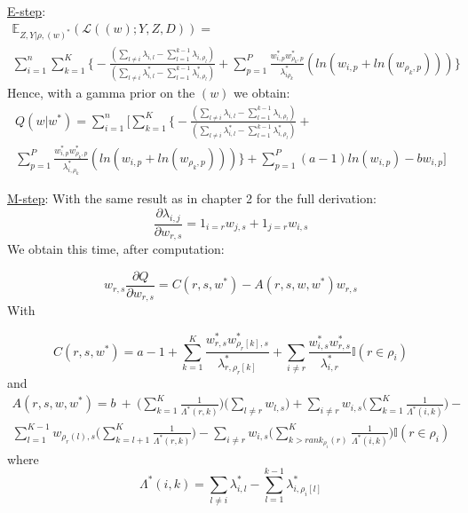 \documentclass[12pt]{ociamthesis}  %
\begin{document}
	\underline{E-step}:
	\begin{multline}
	\mathbb{E}_{Z,Y | \rho, (w)^{*}}(\mathcal{L}((w);Y,Z,D)) = \\ \sum_{i = 1}^{n} \sum_{k = 1}^{K} \bigg\{ -\frac{(\sum_{l \neq i} \lambda_{i,l} - \sum_{l = 1}^{k - 1} \lambda_{i,\rho_{l}})}{(\sum_{l \neq i} \lambda^{*}_{i,l} - \sum_{l = 1}^{k - 1} \lambda^{*}_{i,\rho_{l}})} + \sum_{p = 1}^{P} \frac{w^{*}_{i,p}w^{*}_{\rho_{k},p}}{\lambda^{*}_{i\rho_{k}}} (ln(w_{i,p} + ln(w_{\rho_{k},p}))) \bigg\}
	\end{multline} Hence, with a gamma prior on the $(w)$ we obtain:
	\begin{multline}
	Q(w|w^{*}) = \sum_{i = 1}^{n} \Bigg[ \sum_{k = 1}^{K} \bigg\{ -\frac{(\sum_{l \neq i} \lambda_{i,l} - \sum_{l = 1}^{k - 1} \lambda_{i,\rho_{l}})}{(\sum_{l \neq i} \lambda^{*}_{i,l} - \sum_{l = 1}^{k - 1} \lambda^{*}_{i,\rho_{l}})} + \\ \sum_{p = 1}^{P} \frac{w^{*}_{i,p}w^{*}_{\rho_{k},p}}{\lambda^{*}_{i,\rho_{k}}} (ln(w_{i,p} + ln(w_{\rho_{k},p}))) \bigg\} + \sum_{p = 1}^{P} (a-1)ln(w_{i,p}) - bw_{i,p}  \Bigg]
	\end{multline}
	
	\underline{M-step}: With the same result as in chapter 2 for the full derivation:
	\begin{equation}
	\frac{\partial \lambda_{i,j}}{\partial w_{r,s}} = 1_{i = r} w_{j,s} + 1_{j = r} w_{i,s}
	\end{equation}
	We obtain this time, after computation:
	
	\begin{equation}
	w_{r,s} \frac{\partial Q}{\partial w_{r,s}} = C(r,s,w^{*}) - A(r,s,w,w^{*})w_{r,s}
	\end{equation}
	With
	
	\begin{equation}
	C(r,s,w^{*}) = a - 1 + \sum_{k = 1}^{K}\frac{w^{*}_{r,s}w^{*}_{\rho_{r}[k],s}}{\lambda^{*}_{r,\rho_{r}[k]}} + \sum_{i \neq r} \frac{w^{*}_{i,s}w^{*}_{r,s}}{\lambda^{*}_{i,r}} \mathbb{I}(r \in \rho_{i})
	\end{equation} and
	\begin{multline}
	A(r,s,w,w^{*}) = b \ + \ \bigg( \sum_{k = 1}^{K} \frac{1}{\Lambda^{*}(r,k)} \bigg) \bigg( \sum_{l \neq r} w_{l,s} \bigg) + \sum_{i \neq r} w_{i,s} \bigg( \sum_{k = 1}^{K} \frac{1}{\Lambda^{*}(i,k)} \bigg) - \\ \sum_{l = 1}^{K-1} w_{\rho_{r}(l), s} \bigg( \sum_{k = l+1}^{K} \frac{1}{\Lambda^{*}(r,k)} \bigg) - \sum_{i \neq r} w_{i,s} \bigg( \sum_{k > rank_{\rho_{i}}(r)}^{K} \frac{1}{\Lambda^{*}(i,k)} \bigg)\mathbb{I}(r \in \rho_{i})
	\end{multline} where
	\begin{equation}
	\Lambda^{*}(i,k) = \sum_{l \neq i} \lambda^{*}_{i,l} - \sum_{l = 1}^{k-1} \lambda^{*}_{i,\rho_{i}[l]}
	\end{equation}
	
\end{document}
